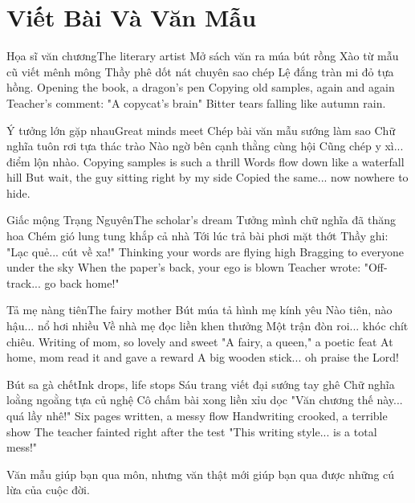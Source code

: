 \chapter{Viết Bài Và Văn Mẫu}

\begin{tutuyetbox}{Họa sĩ văn chương}{The literary artist}
Mở sách văn ra múa bút rồng
Xào từ mẫu cũ viết mênh mông
Thầy phê dốt nát chuyên sao chép
Lệ đắng tràn mi đỏ tựa hồng.
\tcblower
Opening the book, a dragon's pen 
Copying old samples, again and again 
Teacher's comment: "A copycat’s brain" 
Bitter tears falling like autumn rain.
\end{tutuyetbox}

\begin{tutuyetbox}{Ý tưởng lớn gặp nhau}{Great minds meet}
Chép bài văn mẫu sướng làm sao
Chữ nghĩa tuôn rơi tựa thác trào
Nào ngờ bên cạnh thằng cùng hội
Cũng chép y xì... điểm lộn nhào.
\tcblower
Copying samples is such a thrill 
Words flow down like a waterfall hill 
But wait, the guy sitting right by my side 
Copied the same... now nowhere to hide.
\end{tutuyetbox}

\begin{tutuyetbox}{Giấc mộng Trạng Nguyên}{The scholar's dream}
Tưởng mình chữ nghĩa đã thăng hoa
Chém gió lung tung khắp cả nhà
Tới lúc trả bài phơi mặt thớt
Thầy ghi: "Lạc quẻ... cút về xa!"
\tcblower
Thinking your words are flying high 
Bragging to everyone under the sky 
When the paper’s back, your ego is blown 
Teacher wrote: "Off-track... go back home!"
\end{tutuyetbox}

\begin{tutuyetbox}{Tả mẹ nàng tiên}{The fairy mother}
Bút múa tả hình mẹ kính yêu
Nào tiên, nào hậu... nổ hơi nhiều
Về nhà mẹ đọc liền khen thưởng
Một trận đòn roi... khóc chít chiêu.
\tcblower
Writing of mom, so lovely and sweet 
"A fairy, a queen," a poetic feat 
At home, mom read it and gave a reward 
A big wooden stick... oh praise the Lord!
\end{tutuyetbox}

\begin{tutuyetbox}{Bút sa gà chết}{Ink drops, life stops}
Sáu trang viết đại sướng tay ghê
Chữ nghĩa loằng ngoằng tựa củ nghệ
Cô chấm bài xong liền xỉu dọc
"Văn chương thế này... quá lầy nhê!"
\tcblower
Six pages written, a messy flow 
Handwriting crooked, a terrible show 
The teacher fainted right after the test 
"This writing style... is a total mess!"
\end{tutuyetbox}

\begin{ghichu}
Văn mẫu giúp bạn qua môn, nhưng văn thật mới giúp bạn qua được những cú lừa của cuộc đời.
\end{ghichu}